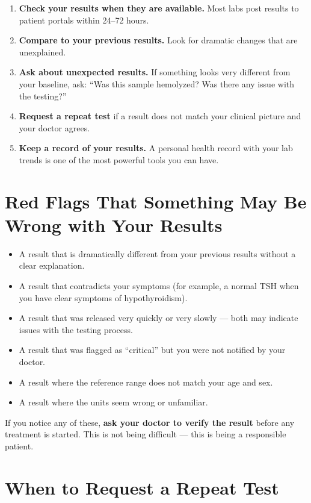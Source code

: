 \begin{enumerate}
    \item \textbf{Check your results when they are available.} Most labs post results to patient portals within 24--72 hours.
    \item \textbf{Compare to your previous results.} Look for dramatic changes that are unexplained.
    \item \textbf{Ask about unexpected results.} If something looks very different from your baseline, ask: ``Was this sample hemolyzed? Was there any issue with the testing?''
    \item \textbf{Request a repeat test} if a result does not match your clinical picture and your doctor agrees.
    \item \textbf{Keep a record of your results.} A personal health record with your lab trends is one of the most powerful tools you can have.
\end{enumerate}

\clearpage
\section{Red Flags That Something May Be Wrong with Your Results}

\begin{itemize}
    \item A result that is dramatically different from your previous results without a clear explanation.
    \item A result that contradicts your symptoms (for example, a normal TSH when you have clear symptoms of hypothyroidism).
    \item A result that was released very quickly or very slowly --- both may indicate issues with the testing process.
    \item A result that was flagged as ``critical'' but you were not notified by your doctor.
    \item A result where the reference range does not match your age and sex.
    \item A result where the units seem wrong or unfamiliar.
\end{itemize}

If you notice any of these, \textbf{ask your doctor to verify the result} before any treatment is started. This is not being difficult --- this is being a responsible patient.

\clearpage
\section{When to Request a Repeat Test}

